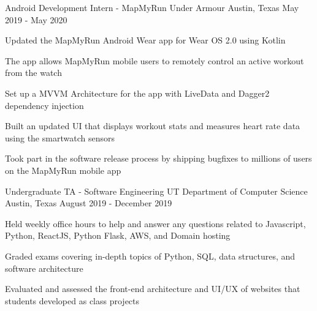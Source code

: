 


\begin{cventries}


\cventry
{Android Development Intern - MapMyRun} %
{Under Armour} %
{Austin, Texas} %
{May 2019 - May 2020} %
{%
\begin{cvitems}
\item {Updated the MapMyRun Android Wear app for Wear OS 2.0 using Kotlin}
\item {The app allows MapMyRun mobile users to remotely control an active workout from the watch}
\item {Set up a MVVM Architecture for the app with LiveData and Dagger2 dependency injection}
\item {Built an updated UI that displays workout stats and measures heart rate data using the smartwatch sensors}
\item {Took part in the software release process by shipping bugfixes to millions of users on the MapMyRun mobile app}
\end{cvitems}
}


\cventry
{Undergraduate TA - Software Engineering} %
{UT Department of Computer Science} %
{Austin, Texas} %
{August 2019 - December 2019} %
{ %
\begin{cvitems}
\item {Held weekly office hours to help and answer any questions related to Javascript, Python, ReactJS, Python Flask, AWS, and Domain hosting}
\item {Graded exams covering in-depth topics of Python, SQL, data structures, and software architecture}
\item {Evaluated and assessed the front-end architecture and UI/UX of websites that students developed as class projects}
\end{cvitems}
}


\end{cventries}
